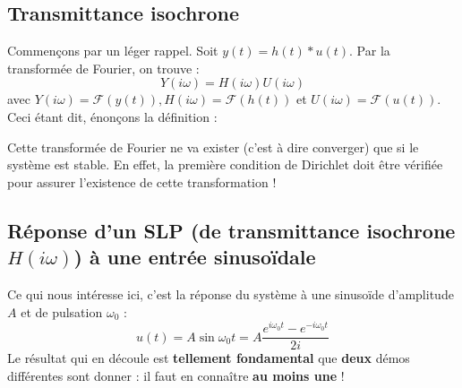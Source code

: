 \subsection{Transmittance isochrone}
Commençons par un léger rappel. Soit $y(t) = h(t)*u(t)$. Par la transformée de Fourier, 
on trouve : 
\begin{equation}
	Y(i\omega) = H(i\omega)U(i\omega)
\end{equation}
avec $Y(i\omega) = \mathcal{F}(y(t)), H(i\omega) = \mathcal{F}(h(t))$ et $U(i\omega) = 
\mathcal{F}(u(t))$.\\
Ceci étant dit, énonçons la définition :\\

	
Cette transformée de Fourier ne va exister (c'est à dire converger) que si le système 
est stable. En effet, la première condition de Dirichlet doit être  vérifiée pour 
assurer l'existence de cette transformation !


\subsection{Réponse d'un SLP (de transmittance isochrone $H(i\omega)$) à une entrée
sinusoïdale}
Ce qui nous intéresse ici, c'est la réponse du système à une sinusoïde d'amplitude 
$A$ et de pulsation $\omega_0$ :
\begin{equation}
	u(t) = A\sin\omega_0t = A \dfrac{e^{i\omega_0t}-e^{-i\omega_0t}}{2i}
	\label{eq:EntreA}
\end{equation}
Le résultat qui en découle est \textbf{tellement fondamental} que \textbf{deux} démos
différentes sont donner : il faut en connaître \textbf{au moins une} ! 
	

